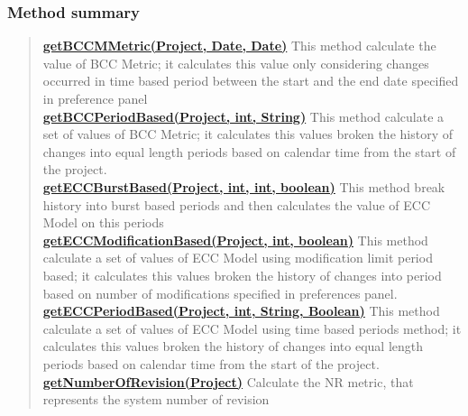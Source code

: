 {{{{{{\subsubsection{Method summary}{
\begin{verse}
\hyperlink{it.unisa.sesa.repominer.metrics.ProjectMetrics.getBCCMMetric(it.unisa.sesa.repominer.db.entities.Project, java.util.Date, java.util.Date)}{{\bf getBCCMMetric(Project, Date, Date)}} This method calculate the value of BCC Metric; it calculates this value only considering changes occurred in time based period between the start and the end date specified in preference panel\\
\hyperlink{it.unisa.sesa.repominer.metrics.ProjectMetrics.getBCCPeriodBased(it.unisa.sesa.repominer.db.entities.Project, int, java.lang.String)}{{\bf getBCCPeriodBased(Project, int, String)}} This method calculate a set of values of BCC Metric; it calculates this values broken the history of changes into equal length periods based on calendar time from the start of the project.\\
\hyperlink{it.unisa.sesa.repominer.metrics.ProjectMetrics.getECCBurstBased(it.unisa.sesa.repominer.db.entities.Project, int, int, boolean)}{{\bf getECCBurstBased(Project, int, int, boolean)}} This method break history into burst based periods and then calculates the value of ECC Model on this periods\\
\hyperlink{it.unisa.sesa.repominer.metrics.ProjectMetrics.getECCModificationBased(it.unisa.sesa.repominer.db.entities.Project, int, boolean)}{{\bf getECCModificationBased(Project, int, boolean)}} This method calculate a set of values of ECC Model using modification limit period based; it calculates this values broken the history of changes into period based on number of modifications specified in preferences panel.\\
\hyperlink{it.unisa.sesa.repominer.metrics.ProjectMetrics.getECCPeriodBased(it.unisa.sesa.repominer.db.entities.Project, int, java.lang.String, java.lang.Boolean)}{{\bf getECCPeriodBased(Project, int, String, Boolean)}} This method calculate a set of values of ECC Model using time based periods method; it calculates this values broken the history of changes into equal length periods based on calendar time from the start of the project.\\
\hyperlink{it.unisa.sesa.repominer.metrics.ProjectMetrics.getNumberOfRevision(it.unisa.sesa.repominer.db.entities.Project)}{{\bf getNumberOfRevision(Project)}} Calculate the NR metric, that represents the system number of revision\\
\end{verse}
}
}}}}}}
